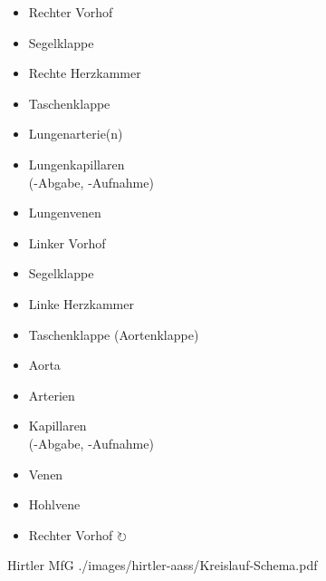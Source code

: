 {%
\begin{itemize}
  \item Rechter Vorhof 
  \item Segelklappe
  \item Rechte Herzkammer
  \item Taschenklappe
  \item Lungenarterie(n) 
  \item Lungenkapillaren \\(-Abgabe, -Auf\-nahme) 
  \item Lungenvenen 
  \item Linker Vorhof 
  \item Segelklappe
  \item Linke Herzkammer 
  \item Taschenklappe (Aortenklappe)
  \item Aorta 
  \item Arterien 
  \item Kapillaren \\(-Abgabe, -Auf\-nahme)  
  \item Venen
  \item Hohlvene 
  \item Rechter Vorhof $\circlearrowright$
\end{itemize}
}




{}
{\label{fig:blutkreislauf-schema}}
{Hirtler}
{MfG}
{./images/hirtler-aass/Kreislauf-Schema.pdf}
{}


